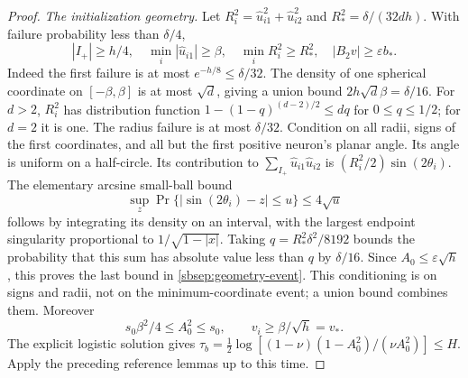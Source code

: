 \documentclass[11pt]{article}
\theoremstyle{remark}
\begin{document}
\begin{proof}
\emph{The initialization geometry.}
Let $R_i^2=\widehat u_{i1}^2+\widehat u_{i2}^2$ and
$R_*^2=\delta/(32dh)$. With failure probability less than $\delta/4$,
\begin{equation}\label{sbsep:geometry-event}
 |I_+|\ge h/4,\quad
 \min_i|\widehat u_{i1}|\ge\beta,\quad
 \min_iR_i^2\ge R_*^2,\quad |B_2v|\ge\varepsilon b_*.
\end{equation}
Indeed the first failure is at most $e^{-h/8}\le\delta/32$.
The density of one spherical coordinate on $[-\beta,\beta]$ is at most
$\sqrt d$, giving a union bound $2h\sqrt d\beta=\delta/16$.
For $d>2$, $R_i^2$ has distribution function
$1-(1-q)^{(d-2)/2}\le dq$ for $0\le q\le1/2$; for $d=2$ it is one.
The radius failure is at most $\delta/32$.
Condition on all radii, signs of the first coordinates, and all but the
first positive neuron's planar angle. Its angle is uniform on a
half-circle. Its contribution to
$\sum_{I_+}\widehat u_{i1}\widehat u_{i2}$ is
$(R_i^2/2)\sin(2\theta_i)$. The elementary arcsine small-ball bound
\[
 \sup_z\Pr\{|\sin(2\theta_i)-z|\le u\}\le4\sqrt u
\]
follows by integrating its density on an interval, with the largest
endpoint singularity proportional to $1/\sqrt{1-|x|}$.
Taking $q=R_*^2\delta^2/8192$ bounds the probability that this sum has
absolute value less than $q$ by $\delta/16$.
Since $A_0\le\varepsilon\sqrt h$, this proves the last bound in
\eqref{sbsep:geometry-event}. This conditioning is on signs and radii,
not on the minimum-coordinate event; a union bound combines them.
Moreover
\[
 s_0\beta^2/4\le A_0^2\le s_0,\qquad v_i\ge\beta/\sqrt h=v_*.
\]
The explicit logistic solution gives
$\tau_b=\tfrac12\log[(1-\nu)(1-A_0^2)/(\nu A_0^2)]\le H$.
Apply the preceding reference lemmas up to this time.


\end{proof}
\end{document}
